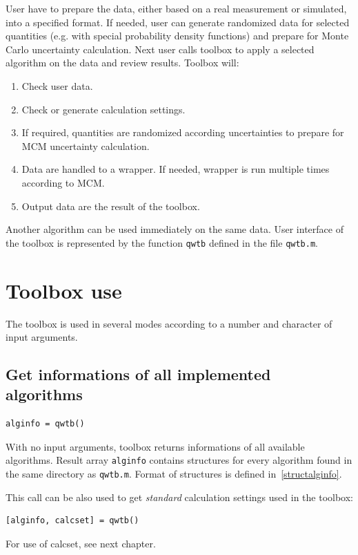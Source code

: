 \documentclass[12pt,a4paper,oneside]{report} %
\newcommand{\li}[1]{\lstinline{#1}}     %
\begin{document}
User have to prepare the data, either based on a real measurement or simulated, into a specified
format. If needed, user can generate randomized data for selected quantities (e.g. with special
probability density functions) and prepare for Monte Carlo uncertainty calculation. Next user calls
toolbox to apply a selected algorithm on the data and review results. Toolbox will:
\begin{enumerate}
        \item Check user data.
        \item Check or generate calculation settings.
        \item If required, quantities are randomized according uncertainties to prepare for MCM uncertainty calculation.
        \item Data are handled to a wrapper. If needed, wrapper is run multiple times according to MCM.
        \item Output data are the result of the toolbox.
\end{enumerate}

Another algorithm can be used immediately on the same data. User interface of the toolbox is represented
by the function \li{qwtb} defined in the file {\tt qwtb.m}.

\section{Toolbox use} %
The toolbox is used in several modes according to a number and character of input arguments.

\subsection{Get informations of all implemented algorithms} %
\begin{lstlisting}
alginfo = qwtb()
\end{lstlisting}

With no input arguments, toolbox returns informations of all available algorithms. Result array
\li{alginfo} contains structures for every algorithm found in the same directory as
\texttt{qwtb.m}. Format of structures is defined in~\ref{structalginfo}.

This call can be also used to get \emph{standard} calculation settings used in the toolbox:
\begin{lstlisting}
[alginfo, calcset] = qwtb()
\end{lstlisting}
For use of calcset, see next chapter.
\end{document}
